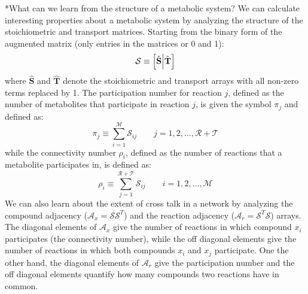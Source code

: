 \documentclass[11pt]{article}
\makeatletter
\theoremstyle{definition}
\renewcommand\subsection{\@startsection
	{subsection}{2}{0mm}
	{-0.05in}
	{-0.5\baselineskip}
	{\normalfont\normalsize\bfseries}}
\makeatother
\begin{document}
\subsection*{What can we learn from the structure of a metabolic system?}
We can calculate interesting properties about a metabolic system by analyzing the structure of the stoichiometric and transport matrices.
Starting from the binary form of the augmented matrix (only entries in the matrices or 0 and 1):
\begin{equation}
	\mathcal{S} \equiv \Bigl[\hat{\mathbf{S}}\Bigr|\hat{\mathbf{T}}\Bigr]
\end{equation}
where $\hat{\mathbf{S}}$ and $\hat{\mathbf{T}}$ denote the stoichiometric and transport arrays with all non-zero terms replaced by 1.
The participation number for reaction $j$, defined as the number of metabolites that participate in reaction $j$, is given the symbol $\pi_{j}$ and defined as:
\begin{equation}
	\pi_{j} \equiv \sum_{i = 1}^{\mathcal{M}}\mathcal{S}_{ij}\qquad j = 1,2,\dots,\mathcal{R} + \mathcal{T}
\end{equation}while the connectivity number $\rho_{i}$, defined as the number of reactions that a metabolite participates in, is defined as:
\begin{equation}
	\rho_{i} \equiv \sum_{j = 1}^{\mathcal{R} + \mathcal{T}}\mathcal{S}_{ij}\qquad i=1,2,\dots,\mathcal{M}
\end{equation}
We can also learn about the extent of cross talk in a network by
analyzing the compound adjacency ($\mathcal{A}_{x} = \mathcal{S}\mathcal{S}^{T}$) and the reaction adjacency ($\mathcal{A}_{r} = \mathcal{S}^{T}\mathcal{S}$) arrays.
The diagonal elements of $\mathcal{A}_{x}$ give the number of reactions in which compound $x_{i}$ participates (the connectivity number),
while the off diagonal elements give the number of reactions in which both compounds $x_{i}$ and $x_{j}$ participate.
One the other hand, the diagonal elements of $\mathcal{A}_{r}$ give the participation number and the off diagonal elements
quantify how many compounds two reactions have in common.
\end{document}
